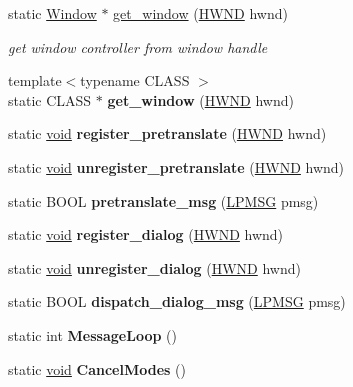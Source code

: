 \begin{DoxyCompactItemize}
static \hyperlink{struct_window}{Window} $\ast$ \hyperlink{struct_window_aedcf41dd85e154e67c5ae03a247b387d}{get\+\_\+window} (\hyperlink{interfacevoid}{H\+W\+ND} hwnd)
\begin{DoxyCompactList}\small\item\em get window controller from window handle \end{DoxyCompactList}\item 
\mbox{\label{struct_window_a231450b17a594c59cfe1c518ebe1027e}} 
{\footnotesize template$<$typename C\+L\+A\+SS $>$ }\\static C\+L\+A\+SS $\ast$ {\bfseries get\+\_\+window} (\hyperlink{interfacevoid}{H\+W\+ND} hwnd)
\item 
\mbox{\label{struct_window_a867f88936a570b5dc1d7bcdfa1ab2f30}} 
static \hyperlink{interfacevoid}{void} {\bfseries register\+\_\+pretranslate} (\hyperlink{interfacevoid}{H\+W\+ND} hwnd)
\item 
\mbox{\label{struct_window_ae4e5956b8dc54ba1bdafd729b99b9b2b}} 
static \hyperlink{interfacevoid}{void} {\bfseries unregister\+\_\+pretranslate} (\hyperlink{interfacevoid}{H\+W\+ND} hwnd)
\item 
\mbox{\label{struct_window_adf308c51b873e1c28876d74bcf3f3063}} 
static B\+O\+OL {\bfseries pretranslate\+\_\+msg} (\hyperlink{structtag_m_s_g}{L\+P\+M\+SG} pmsg)
\item 
\mbox{\label{struct_window_a2a3f46b8333e98ece8b3108660c0024d}} 
static \hyperlink{interfacevoid}{void} {\bfseries register\+\_\+dialog} (\hyperlink{interfacevoid}{H\+W\+ND} hwnd)
\item 
\mbox{\label{struct_window_a6a24e9277fb69fa384307d91310a82ec}} 
static \hyperlink{interfacevoid}{void} {\bfseries unregister\+\_\+dialog} (\hyperlink{interfacevoid}{H\+W\+ND} hwnd)
\item 
\mbox{\label{struct_window_af2c654723dbbf19a89ad9eaad139e296}} 
static B\+O\+OL {\bfseries dispatch\+\_\+dialog\+\_\+msg} (\hyperlink{structtag_m_s_g}{L\+P\+M\+SG} pmsg)
\item 
\mbox{\label{struct_window_a836e3b097fd8293fdf0329c930449c4b}} 
static int {\bfseries Message\+Loop} ()
\item 
\mbox{\label{struct_window_a15ce892fa211802d96fa665d750b246f}} 
static \hyperlink{interfacevoid}{void} {\bfseries Cancel\+Modes} ()
\end{DoxyCompactItemize}
